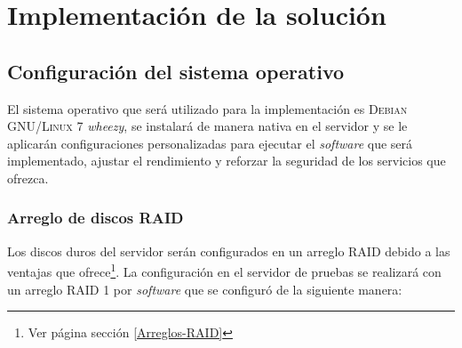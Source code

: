 {
  \linespread{1}
  \cleardoublepage  
  \chapter{Implementaci\'{o}n de la soluci\'{o}n}
  \label{chap:cap3}
}

    \section {Configuraci\'{o}n del sistema operativo}

El sistema operativo que ser\'{a} utilizado para la implementaci\'{o}n es \textsc{Debian GNU/Linux} 7 \guillemotleft\emph{wheezy}\guillemotright, se instalar\'{a} de manera nativa en el servidor y se le aplicar\'{a}n configuraciones personalizadas para ejecutar el \emph{\gls{software}} que ser\'{a} implementado, ajustar el rendimiento y reforzar la seguridad de los servicios que ofrezca.

      \subsection {Arreglo de discos \textsc{RAID}}

Los discos duros del servidor ser\'{a}n configurados en un arreglo \textsc{\gls{RAID}} debido a las ventajas que ofrece\footnote{Ver p\'{a}gina \pageref{Arreglos-RAID} secci\'{o}n \ref{Arreglos-RAID}}. La configuraci\'{o}n en el servidor de pruebas se realizar\'{a} con un arreglo \textsc{\gls{RAID}} 1 por \emph{\gls{software}} que se configur\'{o} de la siguiente manera: \cite{_softwareraid_????}

